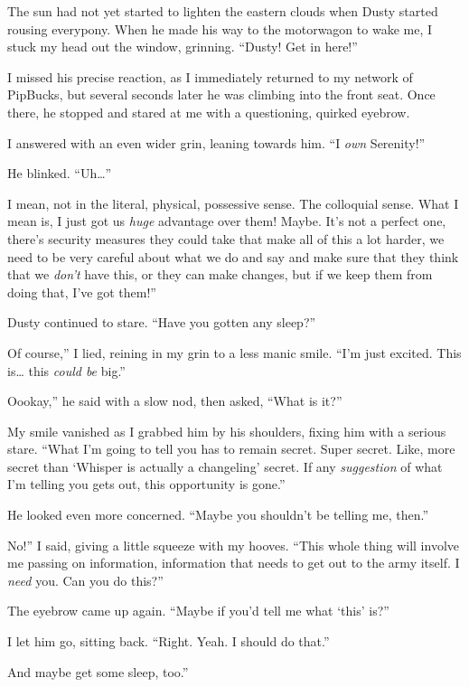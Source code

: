 The sun had not yet started to lighten the eastern clouds when Dusty started rousing everypony. When he made his way to the motorwagon to wake me, I stuck my head out the window, grinning. “Dusty! Get in here!”

I missed his precise reaction, as I immediately returned to my network of PipBucks, but several seconds later he was climbing into the front seat. Once there, he stopped and stared at me with a questioning, quirked eyebrow.

I answered with an even wider grin, leaning towards him. “I \textit{own} Serenity!”

He blinked. “Uh…”

\leavevmode{}I mean, not in the literal, physical, possessive sense. The colloquial sense. What I mean is, I just got us \textit{huge} advantage over them! Maybe. It’s not a perfect one, there’s security measures they could take that make all of this a lot harder, we need to be very careful about what we do and say and make sure that they think that we \textit{don’t} have this, or they can make changes, but if we keep them from doing that, I’ve got them!”

Dusty continued to stare. “Have you gotten any sleep?”

\leavevmode{}Of course,” I lied, reining in my grin to a less manic smile. “I’m just excited. This is… this \textit{could be} big.”

\leavevmode{}Oookay,” he said with a slow nod, then asked, “What is it?”

My smile vanished as I grabbed him by his shoulders, fixing him with a serious stare. “What I’m going to tell you has to remain secret. Super secret. Like, more secret than ‘Whisper is actually a changeling’ secret. If any \textit{suggestion} of what I’m telling you gets out, this opportunity is gone.”

He looked even more concerned. “Maybe you shouldn’t be telling me, then.”

\leavevmode{}No!” I said, giving a little squeeze with my hooves. “This whole thing will involve me passing on information, information that needs to get out to the army itself. I \textit{need} you. Can you do this?”

The eyebrow came up again. “Maybe if you’d tell me what ‘this’ is?”

I let him go, sitting back. “Right. Yeah. I should do that.”

\leavevmode{}And maybe get some sleep, too.”

